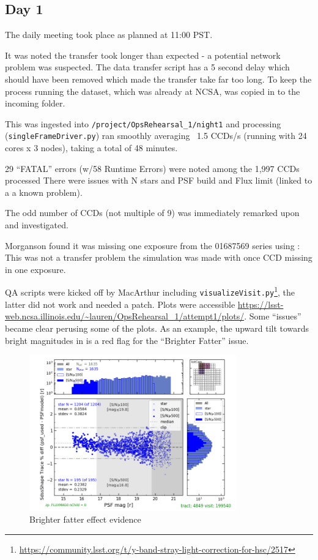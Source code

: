 \subsection{Day 1} \label{sec:day1}

The daily meeting took place as planned at 11:00 \gls{PST}.

It was noted the transfer took longer than expected - a potential network problem was suspected.
The data transfer script has a 5 second delay which should have been removed which made the transfer take far too long.
To keep the process running the dataset, which was already at \gls{NCSA}, was copied in to the incoming folder.

This was ingested into \texttt{/project/OpsRehearsal\_1/night1}  and processing (\texttt{singleFrameDriver.py}) ran  smoothly  averaging  ~1.5 CCDs/s  (running with 24 cores x 3 nodes), taking a total of 48 minutes.


29 “FATAL” errors (w/58 Runtime Errors) were noted among the 1,997 CCDs processed
There were issues with N stars and \gls{PSF} build and  Flux limit (linked to a a known problem).

The odd number of CCDs (not multiple of 9) was immediately remarked upon and investigated.  

Morganson found it was  missing one exposure from the 01687569 series using :
This was not a transfer problem the simulation was made with once \gls{CCD} missing in one exposure.

QA scripts were kicked off by MacArthur including \texttt{visualizeVisit.py}\footnote{\url{https://community.lsst.org/t/y-band-stray-light-correction-for-hsc/2517}}, the latter did not work and needed a \gls{patch}.
Plots were accessible \url{https://lsst-web.ncsa.illinois.edu/~lauren/OpsRehearsal_1/attempt1/plots/}.
Some “issues” became clear perusing some of the plots.  As an example, the upward tilt towards bright magnitudes in  is a red flag for the “Brighter Fatter” issue.


\begin{figure}
\includegraphics[width=0.8\textwidth]{plots/plot-v199540-psfTraceDiff-psfMagHist}
\caption{Brighter fatter effect evidence }
\label{fig:bfp}
\end{figure}



